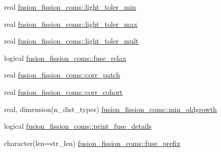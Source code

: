 \begin{DoxyCompactItemize}
\item 
real \hyperlink{namespacefusion__fission__coms_a18de7d0363e629bf717866e1be6d6784}{fusion\+\_\+fission\+\_\+coms\+::light\+\_\+toler\+\_\+min}
\item 
real \hyperlink{namespacefusion__fission__coms_a35ae334e26d06d11e6d7373a538694b9}{fusion\+\_\+fission\+\_\+coms\+::light\+\_\+toler\+\_\+max}
\item 
real \hyperlink{namespacefusion__fission__coms_aa0ffb9883c43635481ab9abb79b66de3}{fusion\+\_\+fission\+\_\+coms\+::light\+\_\+toler\+\_\+mult}
\item 
logical \hyperlink{namespacefusion__fission__coms_ae3996cd91b27f9b130517df7870d5869}{fusion\+\_\+fission\+\_\+coms\+::fuse\+\_\+relax}
\item 
real \hyperlink{namespacefusion__fission__coms_aa480a4503cfdfdbfc8c76fa5570672d1}{fusion\+\_\+fission\+\_\+coms\+::corr\+\_\+patch}
\item 
real \hyperlink{namespacefusion__fission__coms_ae94ecd34b091879520d758e554ec9efc}{fusion\+\_\+fission\+\_\+coms\+::corr\+\_\+cohort}
\item 
real, dimension(n\+\_\+dist\+\_\+types) \hyperlink{namespacefusion__fission__coms_a9cf3e613ab7d8869809784220ab99b1b}{fusion\+\_\+fission\+\_\+coms\+::min\+\_\+oldgrowth}
\item 
logical \hyperlink{namespacefusion__fission__coms_afaa756efb130d43d617b625105e6efc3}{fusion\+\_\+fission\+\_\+coms\+::print\+\_\+fuse\+\_\+details}
\item 
character(len=str\+\_\+len) \hyperlink{namespacefusion__fission__coms_a459ec82605ae0362d2556be00084a964}{fusion\+\_\+fission\+\_\+coms\+::fuse\+\_\+prefix}
\end{DoxyCompactItemize}
